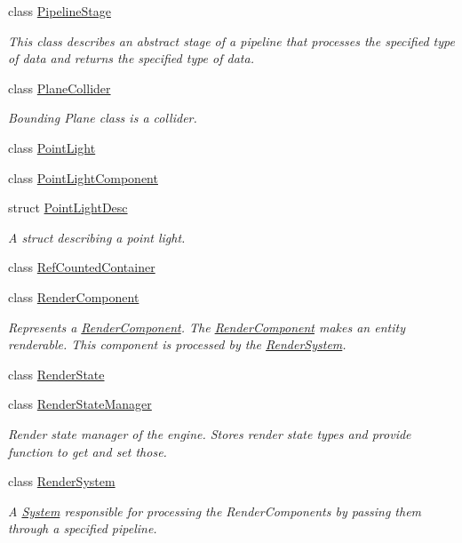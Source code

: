\begin{DoxyCompactItemize}
class \hyperlink{class_blade_1_1_pipeline_stage}{Pipeline\+Stage}
\begin{DoxyCompactList}\small\item\em This class describes an abstract stage of a pipeline that processes the specified type of data and returns the specified type of data. \end{DoxyCompactList}\item 
class \hyperlink{class_blade_1_1_plane_collider}{Plane\+Collider}
\begin{DoxyCompactList}\small\item\em Bounding Plane class is a collider. \end{DoxyCompactList}\item 
class \hyperlink{class_blade_1_1_point_light}{Point\+Light}
\item 
class \hyperlink{class_blade_1_1_point_light_component}{Point\+Light\+Component}
\item 
struct \hyperlink{struct_blade_1_1_point_light_desc}{Point\+Light\+Desc}
\begin{DoxyCompactList}\small\item\em A struct describing a point light. \end{DoxyCompactList}\item 
class \hyperlink{class_blade_1_1_ref_counted_container}{Ref\+Counted\+Container}
\item 
class \hyperlink{class_blade_1_1_render_component}{Render\+Component}
\begin{DoxyCompactList}\small\item\em Represents a \hyperlink{class_blade_1_1_render_component}{Render\+Component}. The \hyperlink{class_blade_1_1_render_component}{Render\+Component} makes an entity renderable. This component is processed by the \hyperlink{class_blade_1_1_render_system}{Render\+System}. \end{DoxyCompactList}\item 
class \hyperlink{class_blade_1_1_render_state}{Render\+State}
\item 
class \hyperlink{class_blade_1_1_render_state_manager}{Render\+State\+Manager}
\begin{DoxyCompactList}\small\item\em Render state manager of the engine. Stores render state types and provide function to get and set those. \end{DoxyCompactList}\item 
class \hyperlink{class_blade_1_1_render_system}{Render\+System}
\begin{DoxyCompactList}\small\item\em A \hyperlink{class_blade_1_1_system}{System} responsible for processing the Render\+Components by passing them through a specified pipeline. \end{DoxyCompactList}\item 

\end{DoxyCompactItemize}
